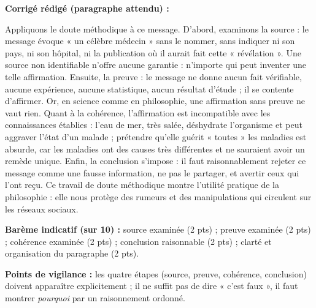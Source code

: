 \documentclass[11pt]{article}
\newcommand{\cle}[1]{{\popxbold\color{popdark}#1}}
\begin{document}
\begin{corrige}
\textbf{Corrigé rédigé (paragraphe attendu) :}

Appliquons le doute méthodique à ce message. D'abord, examinons la \cle{source} : le message évoque « un célèbre médecin » sans le nommer, sans indiquer ni son pays, ni son hôpital, ni la publication où il aurait fait cette « révélation ». Une source non identifiable n'offre aucune garantie : n'importe qui peut inventer une telle affirmation. Ensuite, la \cle{preuve} : le message ne donne aucun fait vérifiable, aucune expérience, aucune statistique, aucun résultat d'étude ; il se contente d'affirmer. Or, en science comme en philosophie, une affirmation sans preuve ne vaut rien. Quant à la \cle{cohérence}, l'affirmation est incompatible avec les connaissances établies : l'eau de mer, très salée, déshydrate l'organisme et peut aggraver l'état d'un malade ; prétendre qu'elle guérit « toutes » les maladies est absurde, car les maladies ont des causes très différentes et ne sauraient avoir un remède unique. Enfin, la \cle{conclusion} s'impose : il faut raisonnablement rejeter ce message comme une fausse information, ne pas le partager, et avertir ceux qui l'ont reçu. Ce travail de doute méthodique montre l'utilité pratique de la philosophie : elle nous protège des rumeurs et des manipulations qui circulent sur les réseaux sociaux.

\textbf{Barème indicatif (sur 10) :} source examinée (2 pts) ; preuve examinée (2 pts) ; cohérence examinée (2 pts) ; conclusion raisonnable (2 pts) ; clarté et organisation du paragraphe (2 pts).

\textbf{Points de vigilance :} les quatre étapes (source, preuve, cohérence, conclusion) doivent apparaître explicitement ; il ne suffit pas de dire « c'est faux », il faut montrer \emph{pourquoi} par un raisonnement ordonné.
\end{corrige}
\end{document}
